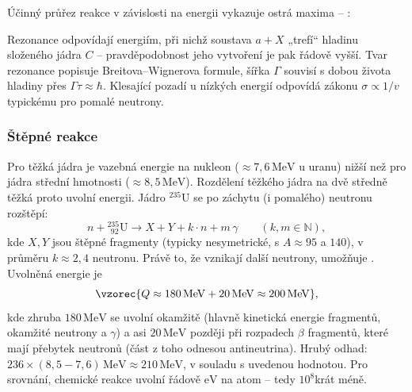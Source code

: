 Účinný průřez reakce v závislosti na energii vykazuje ostrá maxima -- :

\begin{center}
\end{center}

Rezonance odpovídají energiím, při nichž soustava \(a+X\) „trefí“ hladinu složeného jádra \(C\) -- pravděpodobnost jeho vytvoření
je pak řádově vyšší. Tvar rezonance popisuje Breitova--Wignerova formule, šířka \(\Gamma\) souvisí s dobou života hladiny
přes \(\Gamma\tau\approx\hbar\). Klesající pozadí u nízkých energií odpovídá zákonu \(\sigma\propto 1/v\) typickému pro pomalé neutrony.

\subsubsection{Štěpné reakce}

Pro těžká jádra je vazebná energie na nukleon (\(\approx7{,}6\,\mathrm{MeV}\) u uranu) nižší než pro jádra střední hmotnosti
(\(\approx 8{,}5\,\mathrm{MeV}\)). Rozdělení těžkého jádra na dvě středně těžká proto uvolní energii. Jádro \({}^{235}\mathrm{U}\) se po
záchytu (i pomalého) neutronu rozštěpí:
\[
  n + {}^{235}_{\;\,92}\mathrm{U} \to X + Y + k\cdot n + m\,\gamma \qquad (k,m\in\mathbb{N}),
\]
kde \(X, Y\) jsou štěpné fragmenty (typicky nesymetrické, s \(A\approx 95\) a \(140\)), v průměru \(k\approx2{,}4\) neutronu.
Právě to, že vznikají další neutrony, umožňuje . Uvolněná energie je
\[
  \vzorec{Q \approx 180\,\mathrm{MeV} + 20\,\mathrm{MeV} \approx 200\,\mathrm{MeV}},
\]
kde zhruba \(180\,\mathrm{MeV}\) se uvolní okamžitě (hlavně kinetická energie fragmentů, okamžité neutrony a \(\gamma\)) a asi
\(20\,\mathrm{MeV}\) později při rozpadech \(\beta\) fragmentů, které mají přebytek neutronů (část z toho odnesou antineutrina).
Hrubý odhad: \(236\times(8{,}5-7{,}6)\,\mathrm{MeV}\approx 210\,\mathrm{MeV}\), v souladu s uvedenou hodnotou. Pro srovnání,
chemické reakce uvolní řádově \(\mathrm{eV}\) na atom -- tedy \(10^8\)krát méně.

